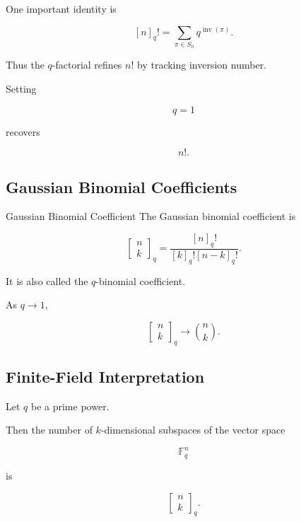 One important identity is

\[
\boxed{
[n]_q!
=
\sum_{\pi\in S_n}
q^{\operatorname{inv}(\pi)}.
}
\]

Thus the \(q\)-factorial refines \(n!\) by tracking inversion number.

Setting

\[
q=1
\]

recovers

\[
n!.
\]

\subsection{Gaussian Binomial Coefficients}
\label{subsec:gaussian-binomial-coefficients}

\begin{definitionbox}{Gaussian Binomial Coefficient}
The Gaussian binomial coefficient is

\[
\boxed{
\begin{bmatrix}
n\\
k
\end{bmatrix}_q
=
\frac{
[n]_q!
}{
[k]_q![n-k]_q!
}.
}
\]
\end{definitionbox}

It is also called the \(q\)-binomial coefficient.

As \(q\to1\),

\[
\boxed{
\begin{bmatrix}
n\\
k
\end{bmatrix}_q
\longrightarrow
\binom{n}{k}.
}
\]

\subsection{Finite-Field Interpretation}
\label{subsec:gaussian-finite-field}

Let \(q\) be a prime power.

Then the number of \(k\)-dimensional subspaces of the vector space

\[
\mathbb{F}_q^n
\]

is

\[
\boxed{
\begin{bmatrix}
n\\
k
\end{bmatrix}_q.
}
\]

